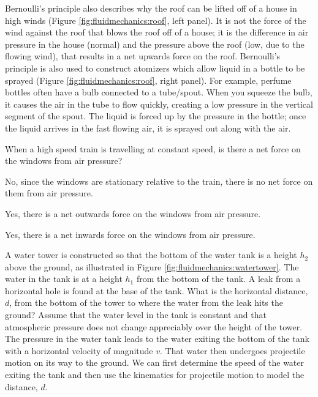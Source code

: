 {{Bernoulli's principle also describes why the roof can be lifted off of a house in high winds (Figure \ref{fig:fluidmechanics:roof}, left panel). It is not the force of the wind against the roof that blows the roof off of a house; it is the difference in air pressure in the house (normal) and the pressure above the roof (low, due to the flowing wind), that results in a net upwards force on the roof. Bernoulli's principle is also used to construct atomizers which allow liquid in a bottle to be sprayed (Figure \ref{fig:fluidmechanics:roof}, right panel). For example, perfume bottles often have a bulb connected to a tube/spout. When you squeeze the bulb, it causes the air in the tube to flow quickly, creating a low pressure in the vertical segment of the spout. The liquid is forced up by the pressure in the bottle; once the liquid arrives in the fast flowing air, it is sprayed out along with the air.

\begin{checkpoint}
\begin{MCquestion}{When a high speed train is travelling at constant speed, is there a net force on the windows from air pressure?}
\item No, since the windows are stationary relative to the train, there is no net force on them from air pressure.
\item Yes, there is a net outwards force on the windows from air pressure. \correct
\item Yes, there is a net inwards force on the windows from air pressure.
\end{MCquestion}
\end{checkpoint}
\newpage
\begin{example}{ A water tower is constructed so that the bottom of the water tank is a height $h_2$ above the ground, as illustrated in Figure \ref{fig:fluidmechanics:watertower}. The water in the tank is at a height $h_1$ from the bottom of the tank. A leak from a horizontal hole is found at the base of the tank. What is the horizontal distance, $d$, from the bottom of the tower to where the water from the leak hits the ground? Assume that the water level in the tank is constant and that atmospheric pressure does not change appreciably over the height of the tower.}
The pressure in the water tank leads to the water exiting the bottom of the tank with a horizontal velocity of magnitude $v$. That water then undergoes projectile motion on its way to the ground. We can first determine the speed of the water exiting the tank and then use the kinematics for projectile motion to model the distance, $d$. 


\end{example}}}
